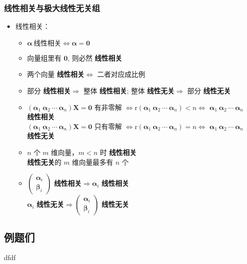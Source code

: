 \documentclass{ctexart}
\newcommand{\。}{．} %
\newcommand{\rr}{\mathrm{r}}
\newcommand{\al}{\bm{\alpha}}
\newcommand{\bt}{\bm{\beta}}
\newcommand{\xxxg}{\textbf{线性相关}}
\newcommand{\xxwg}{\textbf{线性无关}}
\newenvironment{kuang2}{
    \begin{tcolorbox}[colback=hlan!5!white, colframe=hlan, arc = 1mm]
    }
    {\end{tcolorbox}}
\theoremstyle{t} %
\begin{document}
\subsubsection{线性相关与极大线性无关组}

\begin{itemize}
    \item 线性相关：
    \begin{itemize}
        \item $\al\ \xxxg \Leftrightarrow \al = \bm{0}$
        \item 向量组里有 $\bm{0}$, 则必然 \xxxg
        \item 两个向量 \xxxg $\Leftrightarrow$ 二者对应成比例
        \item 部分 \xxxg $\Rightarrow$ 整体 \xxxg; 整体 \xxwg $\Rightarrow$ 部分 \xxwg
        \item $\left(\al_1\ \al_2\ \cdots\ \al_n \right)\bm{X} = \bm{0}$ 有非零解 $\Leftrightarrow \rr\left(\al_1\ \al_2\ \cdots\ \al_n\right) < n \Leftrightarrow$ $\al_1\ \al_2\ \cdots\ \al_n$ \xxxg \\
        $\left(\al_1\ \al_2\ \cdots\ \al_n \right)\bm{X} = \bm{0}$ 只有零解 $\Leftrightarrow \rr\left(\al_1\ \al_2\ \cdots\ \al_n\right) = n \Leftrightarrow$ $\al_1\ \al_2\ \cdots\ \al_n$ \xxwg
        \item $n$ 个 $m$ 维向量，$m < n$ 时 \xxxg \\
        \xxwg 的 $m$ 维向量最多有 $n$ 个
        \item $\begin{pmatrix}
            \al_i \\
            \bt_i
        \end{pmatrix}$ \xxxg $\Rightarrow \al_i$ \xxxg \\
        $\al_i$ \xxwg $\Rightarrow \begin{pmatrix}
            \al_i \\
            \bt_i
        \end{pmatrix}$ \xxwg
    \end{itemize}
\end{itemize}

\begin{kuang2}
    \section{例题们}
\end{kuang2}
dfdf
\end{document}
